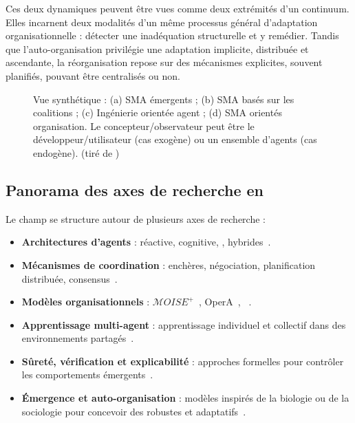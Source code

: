 Ces deux dynamiques peuvent être vues comme deux extrémités d'un continuum. Elles incarnent deux modalités d'un même processus général d'adaptation organisationnelle : détecter une inadéquation structurelle et y remédier. Tandis que l'auto-organisation privilégie une adaptation implicite, distribuée et ascendante, la réorganisation repose sur des mécanismes explicites, souvent planifiés, pouvant être centralisés ou non.

\begin{figure}[h]
    \centering
    \resizebox{\textwidth}{!}{%
        
    }
    \caption{Vue synthétique : (a) SMA émergents ; (b) SMA basés sur les coalitions ; (c) Ingénierie orientée agent ; (d) SMA orientés organisation. Le concepteur/observateur peut être le développeur/utilisateur (cas exogène) ou un ensemble d'agents (cas endogène). (tiré de \cite{Picard2009reorganisation})}
    \label{fig:auto_vs_topdown}
\end{figure}

\subsection*{Panorama des axes de recherche en }

Le champ  se structure autour de plusieurs axes de recherche :

\begin{itemize}
    \item \textbf{Architectures d'agents} : réactive, cognitive, , hybrides~\cite{Georgeff1987}.
    \item \textbf{Mécanismes de coordination} : enchères, négociation, planification distribuée, consensus~\cite{Sandholm1999,Durfee2001}.
    \item \textbf{Modèles organisationnels} : $\mathcal{M}OISE^+$~\cite{hubner2002moise,Hannoun2000}, OperA~\cite{Dignum2004}, ~\cite{Ferber2004}.
    \item \textbf{Apprentissage multi-agent} : apprentissage individuel et collectif dans des environnements partagés~\cite{Zhang2021}.
    \item \textbf{Sûreté, vérification et explicabilité} : approches formelles pour contrôler les comportements émergents~\cite{Boella2006}.
    \item \textbf{Émergence et auto-organisation} : modèles inspirés de la biologie ou de la sociologie pour concevoir des  robustes et adaptatifs~\cite{DiMarzoSerugendo2006,Heylighen1999}.
\end{itemize}


